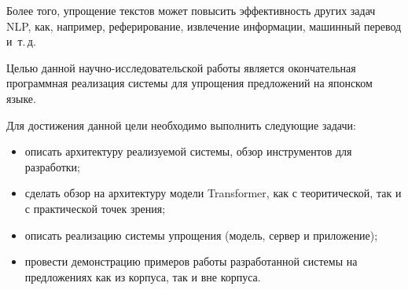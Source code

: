 Более того, упрощение текстов может повысить эффективность других задач NLP, как, например, реферирование, извлечение информации, машинный перевод и~т.\,д.

Целью данной научно-исследовательской работы является окончательная программная реализация системы для упрощения предложений на японском языке.

Для достижения данной цели необходимо выполнить следующие задачи:
\begin{itemize}%
  \item описать архитектуру реализуемой системы, обзор инструментов для разработки;
  \item сделать обзор на архитектуру модели Transformer, как с теоритической, так и с практической точек зрения;
  \item описать реализацию системы упрощения (модель, сервер и приложение);
  \item провести демонстрацию примеров работы разработанной системы на предложениях как из корпуса, так и вне корпуса.
\end{itemize}


